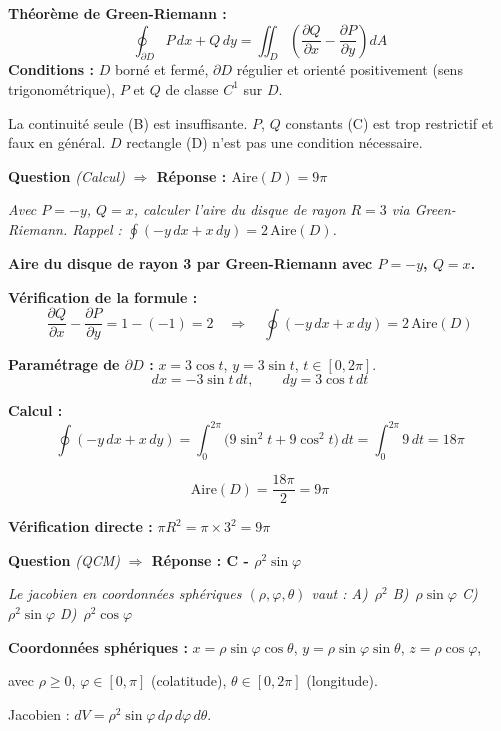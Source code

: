 \documentclass[11pt,a4paper]{article}
\newcounter{qnum}
\newcommand{\qtitre}[2]{%
  \stepcounter{qnum}%
  \medskip\noindent
  \textbf{\color{bleutexte}Question \theqnum}\enspace
  \textit{(#1)}\enspace
  \textcolor{vertok}{\textbf{$\Rightarrow$ Réponse : #2}}
  \par\smallskip
}
\newcommand{\qenonce}[1]{%
  \begin{mdframed}[backgroundcolor=grisbox, linewidth=0pt,
    innerleftmargin=8pt, innerrightmargin=8pt,
    innertopmargin=5pt, innerbottommargin=5pt,
    skipabove=2pt, skipbelow=4pt]
  \small\textit{#1}
  \end{mdframed}
}
\begin{document}
\begin{methodebox}
\textbf{Théorème de Green-Riemann :}
$$\oint_{\partial D} P\,dx + Q\,dy = \iint_D\!\left(\frac{\partial Q}{\partial x} - \frac{\partial P}{\partial y}\right)dA$$
\textbf{Conditions :} $D$ borné et fermé, $\partial D$ régulier et orienté positivement (sens trigonométrique), $P$ et $Q$ de classe $C^1$ sur $D$.
\end{methodebox}

La continuité seule (B) est insuffisante. $P$, $Q$ constants (C) est trop restrictif et faux en général. $D$ rectangle (D) n'est pas une condition nécessaire.

\qtitre{Calcul}{$\mathrm{Aire}(D) = 9\pi$}
\qenonce{Avec $P=-y$, $Q=x$, calculer l'aire du disque de rayon $R=3$ via Green-Riemann. \textit{Rappel :} $\oint(-y\,dx+x\,dy) = 2\,\mathrm{Aire}(D)$.}

\begin{reponsebox}
\textbf{Aire du disque de rayon 3 par Green-Riemann avec $P=-y$, $Q=x$.}

\textbf{Vérification de la formule :}
$$\frac{\partial Q}{\partial x} - \frac{\partial P}{\partial y} = 1-(-1) = 2
\quad\Rightarrow\quad \oint(-y\,dx + x\,dy) = 2\,\mathrm{Aire}(D)$$

\textbf{Paramétrage de $\partial D$ :} $x = 3\cos t$, $y = 3\sin t$, $t \in [0,2\pi]$.
$$dx = -3\sin t\,dt,\qquad dy = 3\cos t\,dt$$

\textbf{Calcul :}
$$\oint(-y\,dx + x\,dy) = \int_0^{2\pi}\bigl(9\sin^2t + 9\cos^2t\bigr)\,dt = \int_0^{2\pi} 9\,dt = 18\pi$$

$$\mathrm{Aire}(D) = \frac{18\pi}{2} = \boxed{9\pi}$$

\textbf{Vérification directe :} $\pi R^2 = \pi \times 3^2 = 9\pi$ \checkmark
\end{reponsebox}

\qtitre{QCM}{C - $\rho^2\sin\varphi$}
\qenonce{Le jacobien en coordonnées sphériques $(\rho,\varphi,\theta)$ vaut :
\quad A)~$\rho^2$ \quad B)~$\rho\sin\varphi$ \quad C)~$\rho^2\sin\varphi$ \quad D)~$\rho^2\cos\varphi$}

\begin{methodebox}
\textbf{Coordonnées sphériques :}
$x = \rho\sin\varphi\cos\theta$,\; $y = \rho\sin\varphi\sin\theta$,\; $z = \rho\cos\varphi$,

avec $\rho \geq 0$, $\varphi \in [0,\pi]$ (colatitude), $\theta \in [0,2\pi]$ (longitude).

Jacobien : $dV = \rho^2\sin\varphi\,d\rho\,d\varphi\,d\theta$.
\end{methodebox}
\end{document}
